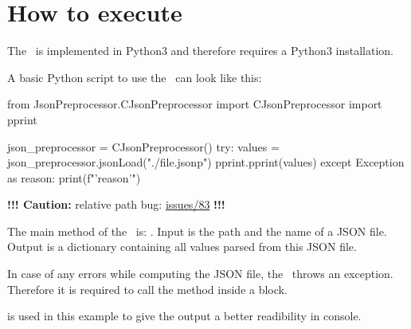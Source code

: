 




\section{How to execute}

The \pkg\ is implemented in Python3 and therefore requires a Python3 installation.

A basic Python script to use the \pkg\ can look like this:

\begin{pythoncode}
from JsonPreprocessor.CJsonPreprocessor import CJsonPreprocessor
import pprint

json_preprocessor = CJsonPreprocessor()
try:
   values = json_preprocessor.jsonLoad("./file.jsonp")
   pprint.pprint(values)
except Exception as reason:
   print(f"'{reason}'")
\end{pythoncode}

\textbf{!!! Caution:} relative path bug:
\href{https://github.com/test-fullautomation/python-jsonpreprocessor/issues/83}{issues/83} \textbf{!!!}

The main method of the \pkg\ is: . Input is the path and the name of a JSON file.
Output is a dictionary containing all values parsed from this JSON file.

In case of any errors while computing the JSON file, the \pkg\ throws an exception. Therefore it is required
to call the method  inside a  block.

 is used in this example to give the output a better readibility in console.

\vspace{2ex}

